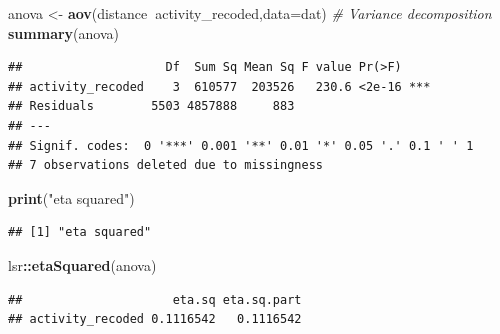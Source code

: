 \documentclass[
]{book}
\newenvironment{Shaded}{\begin{snugshade}}{\end{snugshade}}
\newcommand{\CommentTok}[1]{\textcolor[rgb]{0.56,0.35,0.01}{\textit{#1}}}
\newcommand{\DataTypeTok}[1]{\textcolor[rgb]{0.13,0.29,0.53}{#1}}
\newcommand{\KeywordTok}[1]{\textcolor[rgb]{0.13,0.29,0.53}{\textbf{#1}}}
\newcommand{\NormalTok}[1]{#1}
\newcommand{\OperatorTok}[1]{\textcolor[rgb]{0.81,0.36,0.00}{\textbf{#1}}}
\newcommand{\StringTok}[1]{\textcolor[rgb]{0.31,0.60,0.02}{#1}}
\begin{document}
\begin{Shaded}
\begin{Highlighting}[]
\NormalTok{anova <-}\StringTok{ }\KeywordTok{aov}\NormalTok{(distance}\OperatorTok{~}\NormalTok{activity_recoded,}\DataTypeTok{data=}\NormalTok{dat) }
\CommentTok{# Variance decomposition}
\KeywordTok{summary}\NormalTok{(anova)}
\end{Highlighting}
\end{Shaded}

\begin{verbatim}
##                    Df  Sum Sq Mean Sq F value Pr(>F)    
## activity_recoded    3  610577  203526   230.6 <2e-16 ***
## Residuals        5503 4857888     883                   
## ---
## Signif. codes:  0 '***' 0.001 '**' 0.01 '*' 0.05 '.' 0.1 ' ' 1
## 7 observations deleted due to missingness
\end{verbatim}

\begin{Shaded}
\begin{Highlighting}[]
\KeywordTok{print}\NormalTok{(}\StringTok{"eta squared"}\NormalTok{)}
\end{Highlighting}
\end{Shaded}

\begin{verbatim}
## [1] "eta squared"
\end{verbatim}

\begin{Shaded}
\begin{Highlighting}[]
\NormalTok{lsr}\OperatorTok{::}\KeywordTok{etaSquared}\NormalTok{(anova)}
\end{Highlighting}
\end{Shaded}

\begin{verbatim}
##                     eta.sq eta.sq.part
## activity_recoded 0.1116542   0.1116542
\end{verbatim}

\begin{Shaded}
\end{Shaded}
\end{document}

